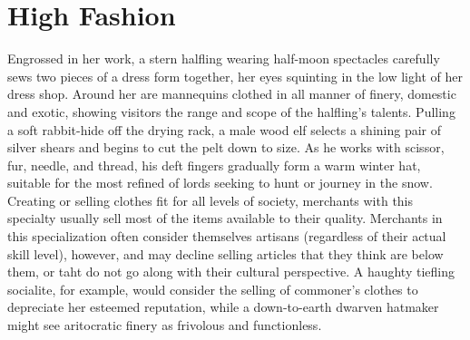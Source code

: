 \documentclass[10pt,a4paper,twoside,twocolumn,openany,nodeprecatedcode,bg=print]{dndbook}
\begin{document}
\section{High Fashion}
Engrossed in her work, a stern halfling wearing half-moon spectacles carefully sews two pieces of a dress form together, her eyes squinting in the low light of her dress shop. Around her are mannequins clothed in all manner of finery, domestic and exotic, showing visitors the range and scope of the halfling's talents.
Pulling a soft rabbit-hide off the drying rack, a male wood elf selects a shining pair of silver shears and begins to cut the pelt down to size. As he works with scissor, fur, needle, and thread, his deft fingers gradually form a warm winter hat, suitable for the most refined of lords seeking to hunt or journey in the snow.
Creating or selling clothes fit for all levels of society, merchants with this specialty usually sell most of the items available to their quality. Merchants in this specialization often consider themselves artisans (regardless of their actual skill level), however, and may decline selling articles that they think are below them, or taht do not go along with their cultural perspective. A haughty tiefling socialite, for example, would consider the selling of commoner's clothes to depreciate her esteemed reputation, while a down-to-earth dwarven hatmaker might see aritocratic finery as frivolous and functionless.
\end{document}
